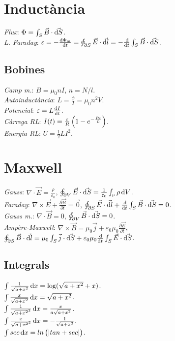 \section{Inductància}
\emph{Flux}: $\Phi = \int_S \vec{B}\cdot \vec{\dif S}$. \\
\emph{L. Faraday}: $\varepsilon = -\frac{\dif \Phi_{\text{m}}}{\dif t} = \oint_{\partial S} \vec{E} \cdot \vec{\dif l} = -\frac{\dif}{\dif t}\int_S \vec{B} \cdot \vec{\dif S}$.

\subsection{Bobines}
\emph{Camp m.}: $B = \mu_0 n I$, $n = N/l$.\\
\emph{Autoinductància}: $L = \frac{\phi}{I} = \mu_0 n^2 V$.\\
\emph{Potencial}: $\varepsilon = L \frac{\dif I}{\dif t}$.\\
\emph{Càrrega RL}: $I(t) = \frac{\varepsilon}{R} \left( 1 - e^{-\frac{Rt}{L}}\right)$.\\
\emph{Energia RL}: $U = \frac{1}{2}LI^2$.

\section{Maxwell}
\emph{Gauss}: $\nabla \cdot \vec{E} = \frac{\rho}{\varepsilon_0} $, $\oint_{\partial V} \vec{E}\cdot \vec{\dif S} = \frac{1}{\varepsilon_0} \int_\nu \rho \dif V$.\\
\emph{Faraday}: $\nabla \times \vec{E} +  \frac{\partial{\vec{B}}}{\partial t} = \vec{0}$,
                $\oint_{\partial S} \vec{E} \cdot \vec{\dif l} + 
                \frac{\dif}{\dif t} \int_S \vec{B} \cdot \vec{\dif S} = 0$.\\
\emph{Gauss m.}: $\nabla \cdot \vec{B} = 0$, $\oint_{\partial V} \vec{B} \cdot
                \vec{\dif S} = 0$.\\
\emph{Ampère-Maxwell}: $\nabla \times \vec{B} = \mu_0 \vec{j} + \varepsilon_0\mu_0
                    \frac{\partial{\vec{E}}}{\partial t}$, $\oint_{\partial{S}}
                    \vec{B} \cdot \vec{\dif l} = \mu_0 
                    \int_S \vec{j} \cdot \vec{\dif S} + \varepsilon_0 \mu_0
                    \frac{\dif}{\dif t} \int_S \vec{E} \cdot \vec{\dif S}$.

\addtocounter{section}{1}
\noindent\makebox[\linewidth]{\rule{\linewidth}{0.5pt}}

\subsection{Integrals}
\ci $\int \frac{1}{\sqrt{a+x^2}}\dif x = \log (\sqrt{a+x^2} + x)$. \\
\ci $\int \frac{x}{\sqrt{a+x^2}}\dif x = \sqrt{a+x^2}$. \\
\ci $\int \frac{1}{\sqrt{a+x^2}^3}\dif x = \frac{x}{a\sqrt{a+x^2}}$. \\
\ci $\int \frac{x}{\sqrt{a+x^2}^3}\dif x = -\frac{1}{\sqrt{a+x^2}}$.\\
\ci $\int sec \dif x = ln \lp |tan + sec| \rp$.

